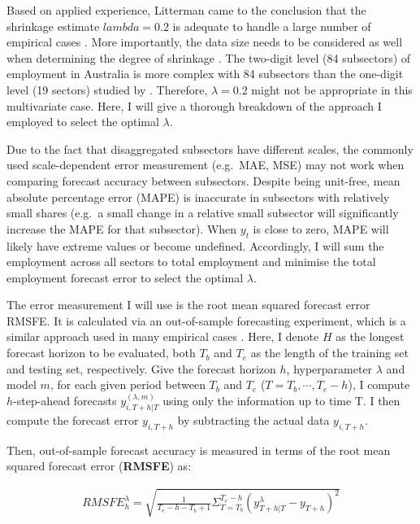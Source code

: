\documentclass{monashthesis}
\begin{document}
Based on applied experience, Litterman came to the conclusion that the shrinkage estimate \(lambda=0.2\) is adequate to handle a large number of empirical cases \autocite{litterman1986}. More importantly, the data size needs to be considered as well when determining the degree of shrinkage \autocite{banbura2010large}. The two-digit level (84 subsectors) of employment in Australia is more complex with 84 subsectors than the one-digit level (19 sectors) studied by \textcite{anderson2020}. Therefore, \(\lambda=0.2\) might not be appropriate in this multivariate case. Here, I will give a thorough breakdown of the approach I employed to select the optimal \(\lambda\).

Due to the fact that disaggregated subsectors have different scales, the commonly used scale-dependent error measurement (e.g.~MAE, MSE) may not work when comparing forecast accuracy between subsectors. Despite being unit-free, mean absolute percentage error (MAPE) is inaccurate in subsectors with relatively small shares (e.g.~a small change in a relative small subsector will significantly increase the MAPE for that subsector). When \(y_t\) is close to zero, MAPE will likely have extreme values or become undefined. Accordingly, I will sum the employment across all sectors to total employment and minimise the total employment forecast error to select the optimal \(\lambda\).

The error measurement I will use is the root mean squared forecast error RMSFE. It is calculated via an out-of-sample forecasting experiment, which is a similar approach used in many empirical cases \autocite{banbura2010large,koop2013}. Here, I denote \(H\) as the longest forecast horizon to be evaluated, both \(T_{b}\) and \(T_{e}\) as the length of the training set and testing set, respectively. Give the forecast horizon \(h\), hyperparameter \(\lambda\) and model \(m\), for each given period between \(T_{b}\) and \(T_{e}\) (\(T=T_b,\cdots,T_{e}-h\)), I compute \(h\)-step-ahead forecasts \({y}_{i,T+h|T}^{(\lambda,m)}\) using only the information up to time T. I then compute the forecast error \(y_{i,T+h}\) by subtracting the actual data \(y_{i,T+h}\).

Then, out-of-sample forecast accuracy is measured in terms of the root mean squared forecast error (\textbf{RMSFE}) as:

\[
\begin{aligned}
RMSFE^{\lambda}_{h}=\sqrt{\frac{1}{T_e-h-T_b+1}\Sigma^{T_{e}-h}_{T=T_{b}}({y}_{T+h|T}^{\lambda}-y_{T+h})^2}
\end{aligned}
\]
\end{document}
